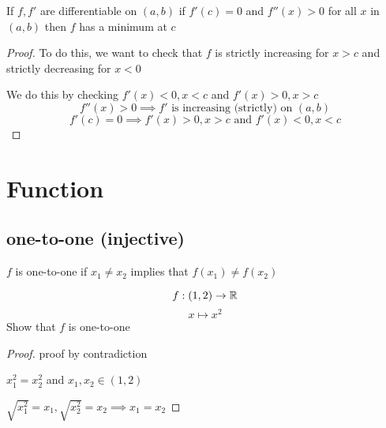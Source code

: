 \begin{theorem*}
  If $f, f'$ are differentiable on $(a, b)$ if $f'(c) = 0$ and $f''(x) > 0$ for all $x$ in $(a, b)$ 
  then $f$ has a minimum at $c$
\end{theorem*}

\begin{proof}
To do this, we want to check that $f$ is strictly increasing for $x > c$ and strictly decreasing for $x < 0$

We do this by checking $f'(x) < 0, x < c$ and $f'(x) > 0, x > c$
$$f''(x) > 0 \implies f' \text{ is increasing (strictly) on }(a, b) $$
$$f'(c) = 0 \implies f'(x) > 0, x > c \text{ and } f'(x) < 0, x < c$$
\end{proof}



\section{Function}

\subsection{one-to-one (injective)}
$f$ is one-to-one if $x_1 \neq x_2$ implies that $f(x_1) \neq f(x_2)$

\begin{example*}
  $$f: (1, 2) \to \mathbb R$$
  $$x \mapsto x^2$$
  Show that $f$ is one-to-one
\end{example*}

\begin{proof}
  proof by contradiction

  $x_1^2 = x_2^2$ and $x_1, x_2 \in (1, 2)$

  $\sqrt{x_1^2} = x_1, \sqrt{x_2^2} = x_2 \implies x_1 = x_2$
\end{proof}


